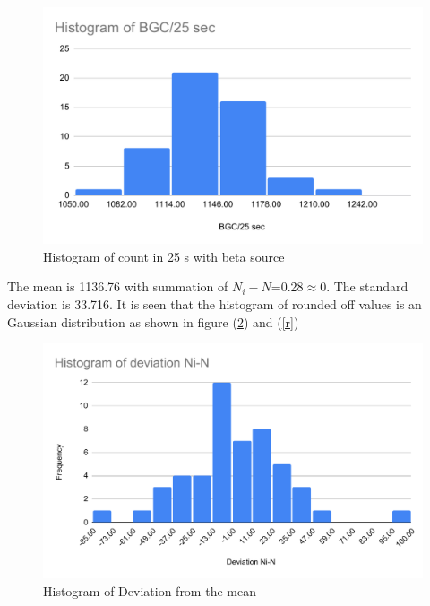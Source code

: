\documentclass[a4paper, amsfonts, amssymb, amsmath, reprint, showkeys, nofootinbib, twoside]{revtex4-1}
\begin{document}
\begin{figure}[H]
	\centering
	\includegraphics[scale=0.4]{25} 
	\caption{Histogram of count in 25 s with beta source}
	\label{25}
\end{figure}

The mean is 1136.76 with summation of $N_i-\bar{N}$=0.28$\approx$0. The standard deviation is 33.716. It is seen that the histogram of rounded off values is an Gaussian distribution as shown in figure (\ref{d}) and (\ref{r})

\begin{figure}[H]
	\centering
	\includegraphics[scale=0.4]{dev} 
	\caption{Histogram of Deviation from the mean}
	\label{d}
\end{figure}
\end{document}
